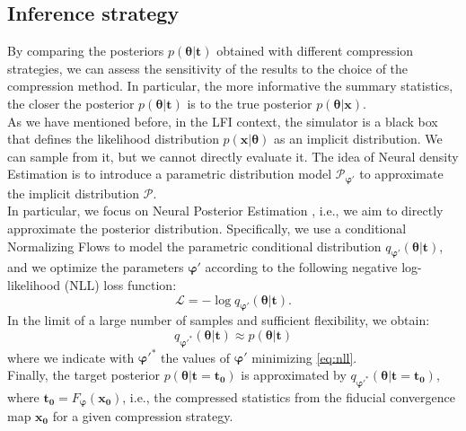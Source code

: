 \documentclass{aa}
\begin{document}
\subsection{Inference strategy}\label{Sec:Inference_strategy}
By comparing the posteriors $p(\bm{\theta}| \bm{t})$ obtained with different compression strategies, we can assess the sensitivity of the results to the choice of the compression method. In particular, the more informative the summary statistics, the closer the posterior $p(\bm{\theta} | \bm{t})$ is to the true posterior $p(\bm{\theta} | \bm{x})$.  \\
As we have mentioned before, in the LFI context, the simulator is a black box that defines the likelihood distribution $p(\bm{x}|\bm{\theta})$ as an implicit distribution. We can sample from it, but we cannot directly evaluate it. The idea of Neural density Estimation is to introduce a parametric distribution model $\mathcal{P}_{\bm{\varphi}'}$ to approximate the implicit distribution $\mathcal{P}$. \\
In particular, we focus on Neural Posterior Estimation \citep{npe1, npe2, npe3}, i.e., we aim to directly approximate the posterior distribution. Specifically, we use a conditional Normalizing Flows \citep{nf1, nf2} to model the parametric conditional distribution $q_{\bm{\varphi}'} (\bm{\theta} | \bm{t})$, and we optimize the parameters ${\bm{\varphi}'}$ according to the following negative log-likelihood (NLL) loss function:
\begin{equation}\label{eq:nll}
    \mathcal{L}=- \log{q_{\bm{\varphi}'}(\bm{\theta}|\bm{t})}.
\end{equation}
In the limit of a large number of samples and sufficient flexibility, we obtain:
\begin{equation}
    q_{\bm{\varphi}'^\ast}(\bm{\theta} | \bm{t}) \approx p(\bm{\theta} | \bm{t})
\end{equation}
where we indicate with $\bm{\varphi}'^\ast$ the values of $\bm{\varphi}'$ minimizing \autoref{eq:nll}. \\
Finally, the target posterior $p(\bm{\theta} | \bm{t} = \bm{t_0})$ is approximated by $q_{\bm{\varphi}'^\ast}(\bm{\theta} | \bm{t} = \bm{t_0})$, where $\bm{t_0} = F_{\bm{\varphi}}(\bm{x_0})$, i.e., the compressed statistics from the fiducial convergence map $\bm{x_0}$ for a given compression strategy.
\end{document}
